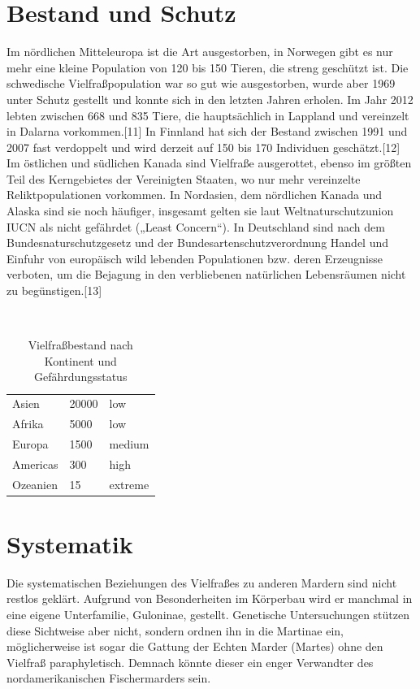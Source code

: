 \documentclass{scrartcl}
\begin{document}
\section{Bestand und Schutz}

Im nördlichen Mitteleuropa ist die Art ausgestorben, in Norwegen gibt es nur mehr eine kleine Population von 120 bis 150 Tieren, die streng geschützt ist. Die schwedische Vielfraßpopulation war so gut wie ausgestorben, wurde aber 1969 unter Schutz gestellt und konnte sich in den letzten Jahren erholen. Im Jahr 2012 lebten zwischen 668 und 835 Tiere, die hauptsächlich in Lappland und vereinzelt in Dalarna vorkommen.[11] In Finnland hat sich der Bestand zwischen 1991 und 2007 fast verdoppelt und wird derzeit auf 150 bis 170 Individuen geschätzt.[12]
\\
Im östlichen und südlichen Kanada sind Vielfraße ausgerottet, ebenso im größten Teil des Kerngebietes der Vereinigten Staaten, wo nur mehr vereinzelte Reliktpopulationen vorkommen. In Nordasien, dem nördlichen Kanada und Alaska sind sie noch häufiger, insgesamt gelten sie laut Weltnaturschutzunion IUCN als nicht gefährdet („Least Concern“). In Deutschland sind nach dem Bundesnaturschutzgesetz und der Bundesartenschutzverordnung Handel und Einfuhr von europäisch wild lebenden Populationen bzw. deren Erzeugnisse verboten, um die Bejagung in den verbliebenen natürlichen Lebensräumen nicht zu begünstigen.[13] 

\begin{table}
    \centering
    \caption{Vielfraßbestand nach Kontinent und Gefährdungsstatus}
    \\
    \begin{tabular}{l|l|l}
         Asien & 20000 & low\\
         Afrika & 5000 & low\\
         Europa & 1500 & medium\\
         Americas & 300 & high\\
         Ozeanien & 15 & extreme\\
    \end{tabular}
\end{table}

\section{Systematik}

Die systematischen Beziehungen des Vielfraßes zu anderen Mardern sind nicht restlos geklärt. Aufgrund von Besonderheiten im Körperbau wird er manchmal in eine eigene Unterfamilie, Guloninae, gestellt. Genetische Untersuchungen stützen diese Sichtweise aber nicht, sondern ordnen ihn in die Martinae ein, möglicherweise ist sogar die Gattung der Echten Marder (Martes) ohne den Vielfraß paraphyletisch. Demnach könnte dieser ein enger Verwandter des nordamerikanischen Fischermarders sein. 
\end{document}
